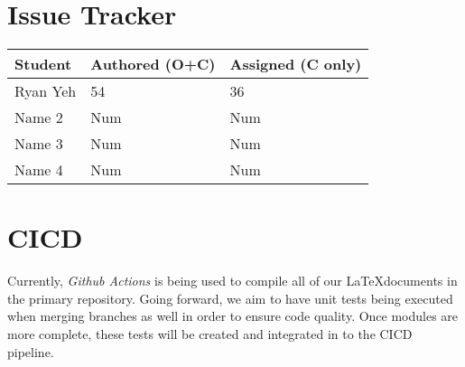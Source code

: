\documentclass{article}
\begin{document}
\section{Issue Tracker}


\begin{table}[H]
\centering
\begin{tabular}{lll}
\toprule
\textbf{Student} & \textbf{Authored (O+C)} & \textbf{Assigned (C only)}\\
\midrule
Ryan Yeh & 54 & 36 \\
Name 2 & Num & Num \\
Name 3 & Num & Num \\
Name 4 & Num & Num \\
\bottomrule
\end{tabular}
\end{table}


\section{CICD}

Currently, \textit{Github Actions} is being used to compile all of our \LaTeX documents in the primary repository.
Going forward, we aim to have unit tests being executed when merging branches as well in order to ensure code quality.
Once modules are more complete, these tests will be created and integrated in to the CICD pipeline.
\end{document}
